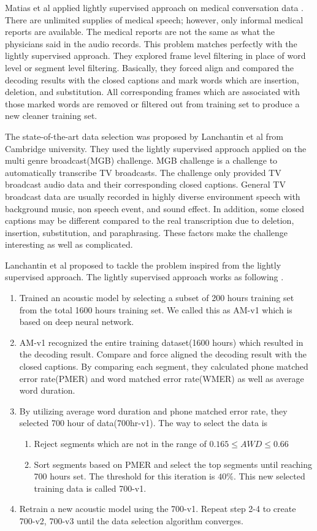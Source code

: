 Matias et al applied lightly supervised approach on medical conversation data \cite{Mathias}. There are unlimited supplies of medical speech; however, only informal medical reports are available. The medical reports are not the same as what the physicians said in the audio records. This problem matches perfectly with the lightly supervised approach. They explored frame level filtering in place of word level or segment level filtering. Basically, they forced align and compared the decoding results with the closed captions and mark words which are insertion, deletion, and substitution. All corresponding frames which are associated with those marked words are removed or filtered out from training set to produce a new cleaner training set.

The state-of-the-art data selection was proposed by  Lanchantin et al from Cambridge university\cite{Lanchantin2016}. They used the lightly supervised approach applied on the multi genre broadcast(MGB) challenge. MGB challenge is a challenge to automatically transcribe TV broadcasts. The challenge only provided TV broadcast audio data and their corresponding closed captions. General TV broadcast data are usually recorded in highly diverse environment speech with background music, non speech event, and sound effect. In addition, some closed captions may be different compared to the real transcription due to deletion, insertion, substitution, and paraphrasing. These factors make the challenge interesting as well as complicated. 

Lanchantin et al proposed to tackle the problem inspired from the lightly supervised approach. The lightly supervised approach works as following \cite{Lanchantin2015}.
\begin{enumerate}
\item Trained an acoustic model by selecting a subset of 200 hours training set from the total 1600 hours training set. We called this as AM-v1 which is based on deep neural network.
\item AM-v1 recognized the entire training dataset(1600 hours) which resulted in the decoding result. Compare and force aligned the decoding result with the closed captions. By comparing each segment, they calculated phone matched error rate(PMER) and word  matched error rate(WMER) as well as average word duration.
\item By utilizing average word duration and phone matched error rate, they selected 700 hour of data(700hr-v1). The way to select the data is 
\begin{enumerate}
\item Reject segments which are not in the range of $0.165 \leq AWD \leq 0.66$
\item Sort segments based on PMER and select the top segments until reaching 700 hours set. The threshold for this iteration is $40\%$. This new selected training data is called 700-v1.
\end{enumerate}
\item Retrain a new acoustic model using the 700-v1. Repeat step 2-4 to create 700-v2, 700-v3 until the data selection algorithm converges. 
\end{enumerate}

